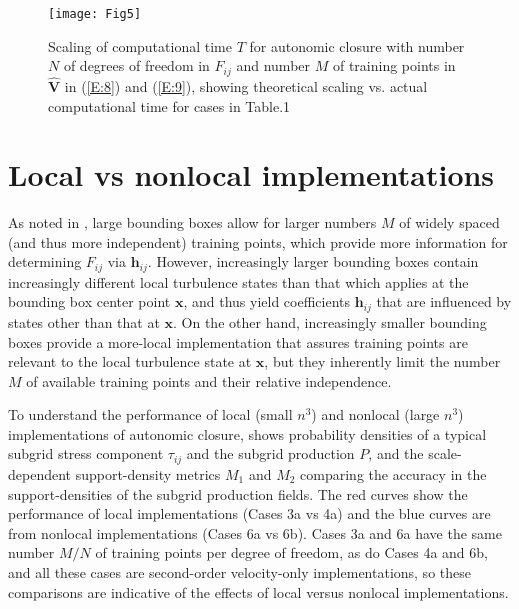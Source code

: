 %
\begin{figure}
	\begin{center}
	\texttt{[image: Fig5]}
	\caption{ Scaling of computational time $T$ for autonomic closure with number $N$ of degrees of freedom in $F_{ij}$ and number $M$ of training points in $\widehat{\mathbf{V}}$ in (\ref{E:8}) and (\ref{E:9}), showing theoretical scaling vs. actual computational time for cases in Table.1}
	\label{F:5}
	\end{center}
\end{figure}
%
%

\section{Local vs nonlocal implementations} 
\label{sec:IVB}

As noted in , large bounding boxes allow for larger numbers $M$ of widely spaced (and thus more independent) training points, which provide more information for determining $F_{ij}$  via $\mathbf{h}_{ij}$. However, increasingly larger bounding boxes contain increasingly different local turbulence states than that which applies at the bounding box center point $\mathbf{x}$, and thus yield coefficients $\mathbf{h}_{ij}$  that are influenced by states other than that at $\mathbf{x}$. On the other hand, increasingly smaller bounding boxes provide a more-local implementation that assures training points are relevant to the local turbulence state at $\mathbf{x}$, but they inherently limit the number $M$ of available training points and their relative independence.  

To understand the performance of local (small $n^3$) and nonlocal (large $n^3$) implementations of autonomic closure,  shows probability densities of a typical subgrid stress component  $\tau_{ij}$ and the subgrid production $P$, and the scale-dependent support-density metrics $M_1$ and $M_2$  comparing the accuracy in the support-densities of the subgrid production fields. The red curves show the performance of local implementations (Cases 3a vs 4a) and the blue curves are from nonlocal implementations (Cases 6a vs 6b). Cases 3a and 6a have the same number $M/N$  of training points per degree of freedom, as do Cases 4a and 6b, and all these cases are second-order velocity-only implementations, so these comparisons are indicative of the effects of local versus nonlocal implementations. 


